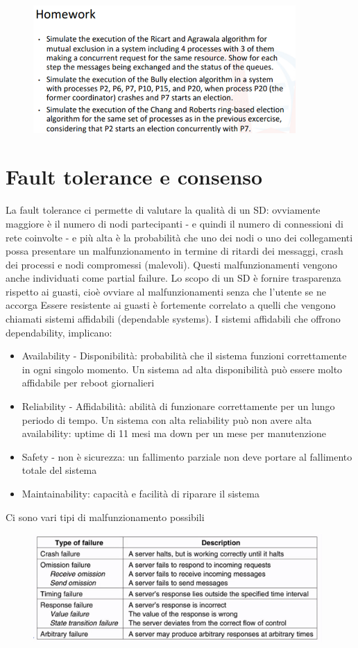 \documentclass[12pt,italian]{report}
\begin{document}
\begin{figure}[h]
\centering
\includegraphics[width=100mm]{img/compitielezione.png}
\end{figure}

\chapter{Fault tolerance e consenso}
La fault tolerance ci permette di valutare la qualità di un SD: ovviamente maggiore è il numero di nodi partecipanti - e quindi il numero di connessioni di rete coinvolte - e più alta è la probabilità che uno dei nodi o uno dei collegamenti possa presentare un malfunzionamento in termine di ritardi dei messaggi, crash dei processi e nodi compromessi (malevoli). Questi malfunzionamenti vengono anche individuati come partial failure. 
\bigbreak
Lo scopo di un SD è fornire trasparenza rispetto ai guasti, cioè ovviare al malfunzionamenti senza che l'utente se ne accorga
\bigbreak
Essere resistente ai guasti è fortemente correlato a quelli che vengono chiamati sistemi affidabili (dependable systems). I sistemi affidabili che offrono dependability, implicano:
\begin{itemize}
    \item Availability - Disponibilità: probabilità che il sistema funzioni correttamente in ogni singolo momento. Un sistema ad alta disponibilità può essere molto affidabile per reboot giornalieri
    \item Reliability - Affidabilità: abilità di funzionare correttamente per un lungo periodo di tempo. Un sistema con alta reliability può non avere alta availability: uptime di 11 mesi ma down per un mese per manutenzione
    \item Safety - non è sicurezza: un fallimento parziale non deve portare al fallimento totale del sistema
    \item Maintainability: capacità e facilità di riparare il sistema
\end{itemize}
\newpage
\noindent Ci sono vari tipi di malfunzionamento possibili
\begin{figure}[h]
\centering
\includegraphics[width=110mm]{img/fault.png}
\end{figure}
\end{document}
